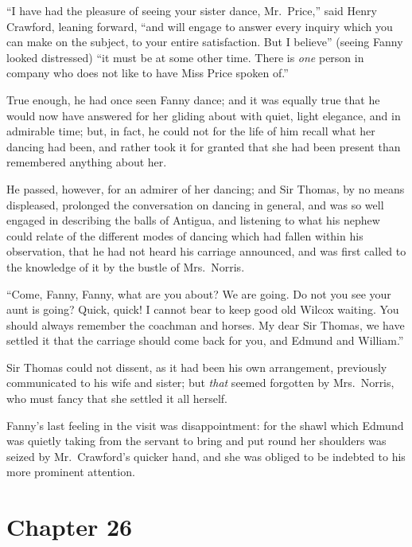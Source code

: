 ``I have had the pleasure of seeing your sister dance,
Mr.\ Price,'' said Henry Crawford, leaning forward,
``and will engage to answer every inquiry which you can
make on the subject, to your entire satisfaction.
But I believe'' (seeing Fanny looked distressed) ``it must
be at some other time.  There is \emph{one} person in company
who does not like to have Miss Price spoken of.''

True enough, he had once seen Fanny dance; and it was
equally true that he would now have answered for her gliding
about with quiet, light elegance, and in admirable time;
but, in fact, he could not for the life of him recall
what her dancing had been, and rather took it for granted
that she had been present than remembered anything about her.

He passed, however, for an admirer of her dancing;
and Sir Thomas, by no means displeased, prolonged the
conversation on dancing in general, and was so well
engaged in describing the balls of Antigua, and listening
to what his nephew could relate of the different modes
of dancing which had fallen within his observation,
that he had not heard his carriage announced, and was first
called to the knowledge of it by the bustle of Mrs.\ Norris.

``Come, Fanny, Fanny, what are you about?  We are going.
Do not you see your aunt is going?  Quick, quick!  I cannot
bear to keep good old Wilcox waiting.  You should always
remember the coachman and horses.  My dear Sir Thomas,
we have settled it that the carriage should come back for you,
and Edmund and William.''

Sir Thomas could not dissent, as it had been his
own arrangement, previously communicated to his wife
and sister; but \emph{that} seemed forgotten by Mrs.\ Norris,
who must fancy that she settled it all herself.

Fanny's last feeling in the visit was disappointment:
for the shawl which Edmund was quietly taking from the
servant to bring and put round her shoulders was seized
by Mr.\ Crawford's quicker hand, and she was obliged to be
indebted to his more prominent attention.



\chapter{Chapter 26}

